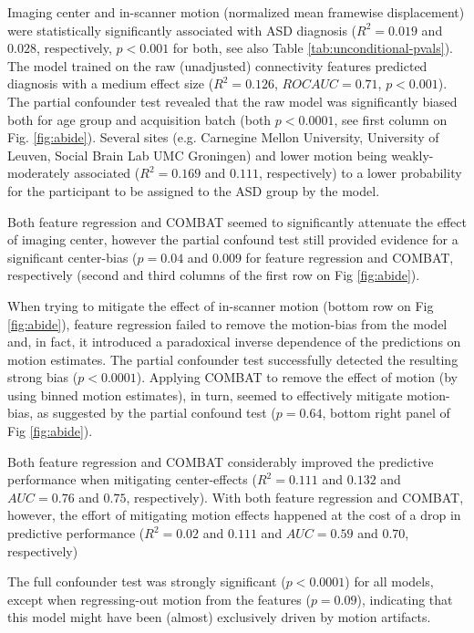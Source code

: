 \documentclass{article}
\begin{document}
Imaging center and in-scanner motion (normalized mean framewise displacement) were statistically significantly associated with ASD diagnosis ($R^2=0.019$ and $0.028$, respectively, $p<0.001$ for both, see also Table \ref{tab:unconditional-pvals}). The model trained on the raw (unadjusted) connectivity features predicted diagnosis with a medium effect size ($R^2=0.126$, $ROC AUC = 0.71$, $p<0.001$).
The partial confounder test revealed that the raw model was significantly biased both for age group and acquisition batch (both $p<0.0001$, see first column on Fig. \ref{fig:abide}). Several sites (e.g. Carnegine Mellon University, University of Leuven, Social Brain Lab UMC Groningen) and lower motion being weakly-moderately associated ($R^2=0.169$ and $0.111$, respectively) to a lower probability for the participant to be assigned to the ASD group by the model.

Both feature regression and COMBAT seemed to significantly attenuate the effect of imaging center, however the partial confound test still provided evidence for a significant center-bias ($p=0.04$ and $0.009$ for feature regression and COMBAT, respectively (second and third columns of the first row on Fig \ref{fig:abide}). 

When trying to mitigate the effect of in-scanner motion (bottom row on Fig \ref{fig:abide}), feature regression failed to remove the motion-bias from the model and, in fact, it introduced a paradoxical inverse dependence of the predictions on motion estimates. The partial confounder test successfully detected the resulting strong bias ($p<0.0001$). Applying COMBAT to remove the effect of motion (by using binned motion estimates), in turn, seemed to effectively mitigate motion-bias, as suggested by the partial confound test ($p=0.64$, bottom right panel of Fig \ref{fig:abide}).

Both feature regression and COMBAT considerably improved the predictive performance when mitigating center-effects ($R^2=0.111$ and $0.132$ and $AUC=0.76$ and $0.75$, respectively). With both feature regression and COMBAT, however, the effort of mitigating motion effects happened at the cost of a drop in predictive performance ($R^2=0.02$ and $0.111$ and $AUC=0.59$ and $0.70$, respectively)

The full confounder test was strongly significant ($p<0.0001$) for all models, except when regressing-out motion from the features ($p=0.09$), indicating that this model might have been (almost) exclusively driven by motion artifacts.
\end{document}
